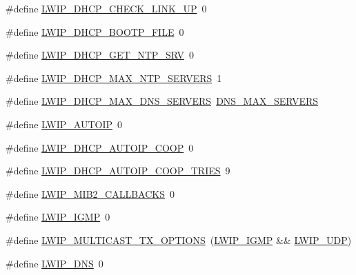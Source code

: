 \begin{DoxyCompactItemize}
\item 
\#define \hyperlink{group__lwip__opts__dhcp_ga1e9ec404a96581fdbc9d231a8a698a60}{L\+W\+I\+P\+\_\+\+D\+H\+C\+P\+\_\+\+C\+H\+E\+C\+K\+\_\+\+L\+I\+N\+K\+\_\+\+UP}~0
\item 
\#define \hyperlink{group__lwip__opts__dhcp_ga3c2983cbd228011dd3e18cb417e7e423}{L\+W\+I\+P\+\_\+\+D\+H\+C\+P\+\_\+\+B\+O\+O\+T\+P\+\_\+\+F\+I\+LE}~0
\item 
\#define \hyperlink{group__lwip__opts__dhcp_ga2cc18315edcd5ffc083d1256f7d22a83}{L\+W\+I\+P\+\_\+\+D\+H\+C\+P\+\_\+\+G\+E\+T\+\_\+\+N\+T\+P\+\_\+\+S\+RV}~0
\item 
\#define \hyperlink{group__lwip__opts__dhcp_ga9d014e3f7dc9e1e7c7decd8652ba65e2}{L\+W\+I\+P\+\_\+\+D\+H\+C\+P\+\_\+\+M\+A\+X\+\_\+\+N\+T\+P\+\_\+\+S\+E\+R\+V\+E\+RS}~1
\item 
\#define \hyperlink{group__lwip__opts__dhcp_ga60ccc20fbb08be24b5d5f599dd47a6a6}{L\+W\+I\+P\+\_\+\+D\+H\+C\+P\+\_\+\+M\+A\+X\+\_\+\+D\+N\+S\+\_\+\+S\+E\+R\+V\+E\+RS}~\hyperlink{group__lwip__opts__dns_ga9f9881c887a8aceb9765820c2dbdf292}{D\+N\+S\+\_\+\+M\+A\+X\+\_\+\+S\+E\+R\+V\+E\+RS}
\item 
\#define \hyperlink{group__lwip__opts__autoip_gaaf1b3a089827223589baf1b7f4f57069}{L\+W\+I\+P\+\_\+\+A\+U\+T\+O\+IP}~0
\item 
\#define \hyperlink{group__lwip__opts__autoip_ga1a91e18dbb9777bc6e3963f52cb5f9fe}{L\+W\+I\+P\+\_\+\+D\+H\+C\+P\+\_\+\+A\+U\+T\+O\+I\+P\+\_\+\+C\+O\+OP}~0
\item 
\#define \hyperlink{group__lwip__opts__autoip_ga4ff3f941b4c71a04b0c30fbee5b198c2}{L\+W\+I\+P\+\_\+\+D\+H\+C\+P\+\_\+\+A\+U\+T\+O\+I\+P\+\_\+\+C\+O\+O\+P\+\_\+\+T\+R\+I\+ES}~9
\item 
\#define \hyperlink{group__lwip__opts__mib2_gad84d6a781880cec19a1ef4b2339fea29}{L\+W\+I\+P\+\_\+\+M\+I\+B2\+\_\+\+C\+A\+L\+L\+B\+A\+C\+KS}~0
\item 
\#define \hyperlink{group__lwip__opts__igmp_gadaf25915ae1fd69c0943ef68cbb38923}{L\+W\+I\+P\+\_\+\+I\+G\+MP}~0
\item 
\#define \hyperlink{group__lwip__opts__igmp_gab8d7d53247cc62caa76f54b2c5a5df30}{L\+W\+I\+P\+\_\+\+M\+U\+L\+T\+I\+C\+A\+S\+T\+\_\+\+T\+X\+\_\+\+O\+P\+T\+I\+O\+NS}~(\hyperlink{openmote-cc2538_2lwip_2test_2unit_2lwipopts_8h_adaf25915ae1fd69c0943ef68cbb38923}{L\+W\+I\+P\+\_\+\+I\+G\+MP} \&\& \hyperlink{group__lwip__opts__udp_gab6030e96e72df649d2650fd32d7a67b3}{L\+W\+I\+P\+\_\+\+U\+DP})
\item 
\#define \hyperlink{group__lwip__opts__dns_ga98710dd81446b7cb2daac736bae6f646}{L\+W\+I\+P\+\_\+\+D\+NS}~0

\end{DoxyCompactItemize}
